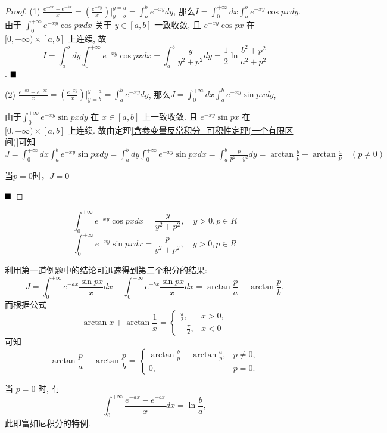 \documentclass[lang=cn,newtx,10pt,scheme=chinese]{elegantbook}
\begin{document}
\begin{proof}
(1)
$\frac{e^{-ax}-e^{-bx}}{x} = \left(\frac{e^{-xy}}{x}\right)\Big|_{y=b}^{y=a} = \int_a^b e^{-xy} dy$,
那么$I = \int_{0}^{+\infty} dx \int_a^b e^{-xy} \cos px dy$. 由于 $\int_{0}^{+\infty} e^{-xy} \cos px dx$ 关于 $y \in [a,b]$ 一致收敛, 且 $e^{-xy} \cos px$ 在 $[0, +\infty) \times [a,b]$ 上连续, 故
$$I = \int_a^b dy \int_0^{+\infty} e^{-xy} \cos px dx = \int_a^b \frac{y}{y^2+p^2} dy = \frac{1}{2} \ln \frac{b^2+p^2}{a^2+p^2}$$. $\hfill \blacksquare$

(2)
$\frac{e^{-ax}-e^{-bx}}{x} = \left(\frac{e^{-xy}}{x}\right) \Big|_{y=b}^{y=a} = \int_a^b e^{-xy} dy$,
那么$J = \int_0^{+\infty} dx \int_a^b e^{-xy} \sin px dy$,

由于$\int_{0}^{+\infty} e^{-xy} \sin px dy$ 在 $x \in [a,b]$ 上一致收敛. 且 $e^{-xy} \sin px$ 在 $[0, +\infty) \times [a,b]$ 上连续. 故由定理\ref{含参变量反常积分_可积性定理(一个有限区间)}可知
$J =  \int_0^{+\infty} dx \int_a^b e^{-xy} \sin px dy =  \int_{a}^{b} dy \int_{0}^{+\infty} e^{-xy} \sin px dx = \int_a^b \frac{p}{p^2+y^2} dy = \arctan\frac{b}{p} - \arctan\frac{a}{p} \quad (p \ne 0)$

当$p=0$时，$J = 0$

$\hfill \blacksquare$
\end{proof}

\begin{proposition*}
    $$\int_0^{+\infty} e^{-xy} \cos px dx = \frac{y}{y^2+p^2}, \quad y>0, p \in R$$
    $$\int_{0}^{+\infty} e^{-xy} \sin px dx = \frac{p}{y^2+p^2}, \quad y>0, p \in R$$
\end{proposition*}

\begin{remark}
利用第一道例题中的结论可迅速得到第二个积分的结果:
$$ J = \int_{0}^{+\infty} e^{-ax}\frac{\sin px}{x}dx - \int_{0}^{+\infty} e^{-bx}\frac{\sin px}{x}dx = \arctan\frac{p}{a} - \arctan\frac{p}{b}. $$
而根据公式
$$ \arctan x + \arctan \frac{1}{x} = \begin{cases} \frac{\pi}{2}, & x>0, \\ -\frac{\pi}{2}, & x<0 \end{cases} $$
可知
$$ \arctan\frac{p}{a} - \arctan\frac{p}{b} = \begin{cases} \arctan\frac{b}{p} - \arctan\frac{a}{p}, & p \ne 0, \\ 0, & p=0. \end{cases} $$

\end{remark}
\begin{remark}
当 $p=0$ 时, 有
$$ \int_{0}^{+\infty} \frac{e^{-ax}-e^{-bx}}{x}dx = \ln\frac{b}{a}, $$
此即富如尼积分的特例.
\end{remark}
\end{document}

